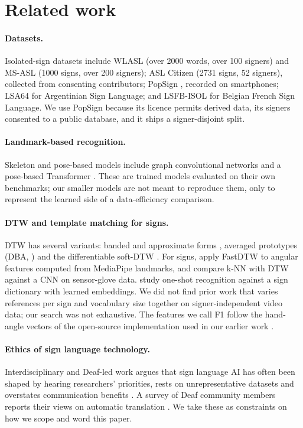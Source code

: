 \section{Related work}
\paragraph{Datasets.} Isolated-sign datasets include WLASL \citep{li2020wlasl} (over 2000 words, over 100 signers) and MS-ASL
\citep{vaezi2019msasl} (1000 signs, over 200 signers); ASL Citizen \citep{desai2023aslcitizen} (2731 signs, 52 signers),
collected from consenting contributors; PopSign \citep{starner2023popsign}, recorded on smartphones; LSA64 \citep{ronchetti2023lsa64} for Argentinian Sign Language; and LSFB-ISOL \citep{fink2021lsfb}
for Belgian French Sign Language. We use PopSign because its licence permits derived data, its signers consented to a
public database, and it ships a signer-disjoint split.

\paragraph{Landmark-based recognition.} Skeleton and pose-based models include graph convolutional networks
\citep{jiang2021slgcn} and a pose-based Transformer \citep{bohacek2022spoter}. These are trained models evaluated on
their own benchmarks; our smaller models are not meant to reproduce them, only to represent the learned side of a
data-efficiency comparison.

\paragraph{DTW and template matching for signs.} DTW \citep{sakoe1978} has several variants: banded and approximate forms
\citep{salvador2007fastdtw}, averaged prototypes (DBA, \citealp{petitjean2011dba}) and the differentiable soft-DTW
\citep{cuturi2017softdtw}. For signs, \citet{arcanjo2024} apply FastDTW to angular features computed from MediaPipe
landmarks, and \citet{saggio2020} compare k-NN with DTW against a CNN on sensor-glove data. \citet{vandendriessche2025onesh}
study one-shot recognition against a sign dictionary with learned embeddings. We did not find prior work that varies references per sign and
vocabulary size together on signer-independent video data; our search was not exhaustive. The features we call F1 follow
the hand-angle vectors of the open-source implementation \citep{guerin2022signdtw} used in our earlier work
\citep{mankar2024}.

\paragraph{Ethics of sign language technology.} Interdisciplinary and Deaf-led work argues that sign language AI has often
been shaped by hearing researchers' priorities, rests on unrepresentative datasets and overstates communication benefits
\citep{bragg2019assets,bragg2021fate,desai2024biases}. A survey of Deaf community members reports their views on automatic
translation \citep{tran2023assets}. We take these as constraints on how we scope and word this paper.
